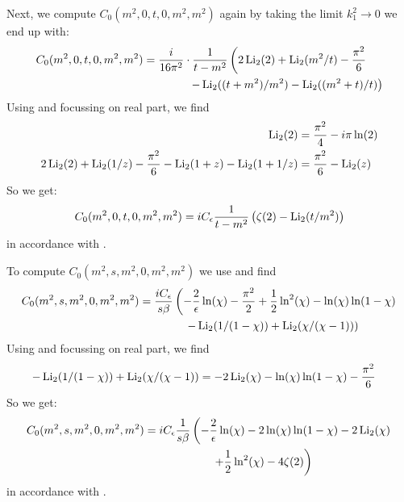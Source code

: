 Next, we compute $C_0(m^2,0,t,0,m^2,m^2)$ again by taking the limit $k_1^2\rightarrow 0$ we end up with:
\begin{align}
C_0(m^2,0,t,0,m^2,m^2) &= \frac{i}{16\pi^2}\cdot\frac 1{t-m^2}\left(2\operatorname{\text{Li}_2}(2) + \operatorname{\text{Li}_2}(m^2/t)-\frac{\pi^2}6\right.\nonumber\\
 &\hspace{40pt}\left.-\operatorname{\text{Li}_2}((t+m^2)/m^2)-\operatorname{\text{Li}_2}((m^2+t)/t)\right)
\end{align}
Using \cite{Zagier2007} and focussing on real part, we find
\begin{align}
\operatorname{\text{Li}_2}(2) &= \frac{\pi^2}4-i\pi\ln(2)\\
2\operatorname{\text{Li}_2}(2) + \operatorname{\text{Li}_2}(1/z)-\frac{\pi^2}6-\operatorname{\text{Li}_2}(1+z)-\operatorname{\text{Li}_2}(1+1/z) &=\frac{\pi^2}6-\operatorname{\text{Li}_2}(z)
\end{align}
So we get:
\begin{equation}
C_0(m^2,0,t,0,m^2,m^2)=iC_\epsilon\frac 1{t-m^2}\left(\zeta(2)-\operatorname{\text{Li}_2}(t/m^2)\right)
\end{equation}
in accordance with \cite{Bojak:2000eu}\cite{PhysRevD.40.54}.

To compute $C_0(m^2,s,m^2,0,m^2,m^2)$ we use \cite{Bojak:2000eu} and find
\begin{align}
C_0(m^2,s,m^2,0,m^2,m^2) &= \frac{i C_\epsilon}{s\beta}\left(-\frac 2 {\epsilon} \ln(\chi)-\frac{\pi^2}2 + \frac 1 2\ln^2(\chi) - \ln(\chi)\ln(1-\chi)\right.\nonumber\\
 &\hspace{40pt}\left.-\operatorname{\text{Li}_2}(1/(1-\chi))+\operatorname{\text{Li}_2}(\chi/(\chi-1))\right)
\end{align}
Using \cite{Zagier2007} and focussing on real part, we find
\begin{align}
-\operatorname{\text{Li}_2}(1/(1-\chi)) + \operatorname{\text{Li}_2}(\chi/(\chi-1))&=-2\operatorname{\text{Li}_2}(\chi)-\ln(\chi)\ln(1-\chi)-\frac{\pi^2}6
\end{align}
So we get:
\begin{align}
C_0(m^2,s,m^2,0,m^2,m^2) &=iC_\epsilon\frac 1{s\beta}\left(-\frac 2 {\epsilon} \ln(\chi)-2\ln(\chi)\ln(1-\chi)-2\operatorname{\text{Li}_2}(\chi)\right.\nonumber\\
 &\hspace{60pt}\left.+\frac 1 2\ln^2(\chi)-4\zeta(2)\right)
\end{align}
in accordance with \cite{Bojak:2000eu}\cite{PhysRevD.40.54}.

